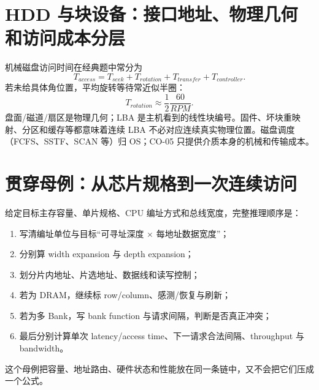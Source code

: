 \documentclass[UTF8,fontset=fandol,11pt,a4paper]{ctexart}
\begin{document}
\section{HDD 与块设备：接口地址、物理几何和访问成本分层}
机械磁盘访问时间在经典题中常分为
\[
T_{access}=T_{seek}+T_{rotation}+T_{transfer}+T_{controller}.
\]
若未给具体角位置，平均旋转等待常近似半圈：
\[
T_{rotation}\approx\frac12\frac{60}{RPM}.
\]
盘面/磁道/扇区是物理几何；LBA 是主机看到的线性块编号。固件、坏块重映射、分区和缓存等都意味着连续 LBA 不必对应连续真实物理位置。磁盘调度（FCFS、SSTF、SCAN 等）归 OS；CO-05 只提供介质本身的机械和传输成本。

\section{贯穿母例：从芯片规格到一次连续访问}
给定目标主存容量、单片规格、CPU 编址方式和总线宽度，完整推理顺序是：
\begin{enumerate}
\item 写清编址单位与目标“可寻址深度 $\times$ 每地址数据宽度”；
\item 分别算 width expansion 与 depth expansion；
\item 划分片内地址、片选地址、数据线和读写控制；
\item 若为 DRAM，继续标 row/column、感测/恢复与刷新；
\item 若为多 Bank，写 bank function 与请求间隔，判断是否真正冲突；
\item 最后分别计算单次 latency/access time、下一请求合法间隔、throughput 与 bandwidth。
\end{enumerate}
这个母例把容量、地址路由、硬件状态和性能放在同一条链中，又不会把它们压成一个公式。
\end{document}
